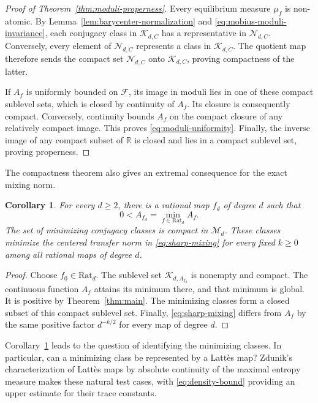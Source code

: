 \documentclass[10pt,a4paper]{amsart}
\newtheorem{corollary}[theorem]{Corollary}
\newcommand{\R}{\mathbb R}
\numberwithin{equation}{section}
\begin{document}
\begin{proof}[Proof of Theorem~\ref{thm:moduli-properness}]
Every equilibrium measure $\mu_f$ is non-atomic. By Lemma~\ref{lem:barycenter-normalization} and \eqref{eq:mobius-moduli-invariance}, each conjugacy class in $\mathcal K_{d,C}$ has a representative in $\mathcal N_{d,C}$. Conversely, every element of $\mathcal N_{d,C}$ represents a class in $\mathcal K_{d,C}$. The quotient map therefore sends the compact set $\mathcal N_{d,C}$ onto $\mathcal K_{d,C}$, proving compactness of the latter.

If $A_f$ is uniformly bounded on $\mathcal F$, its image in moduli lies in one of these compact sublevel sets, which is closed by continuity of $A_f$. Its closure is consequently compact. Conversely, continuity bounds $A_f$ on the compact closure of any relatively compact image. This proves \eqref{eq:moduli-uniformity}. Finally, the inverse image of any compact subset of $\R$ is closed and lies in a compact sublevel set, proving properness.
\end{proof}

The compactness theorem also gives an extremal consequence for the exact mixing norm.

\begin{corollary}\label{cor:moduli-minimum}
For every $d\ge2$, there is a rational map $f_d$ of degree $d$ such that
\[
 0<A_{f_d}=\min_{f\in\mathrm{Rat}_d}A_f.
\]
The set of minimizing conjugacy classes is compact in $\mathcal M_d$. These classes minimize the centered transfer norm in \eqref{eq:sharp-mixing} for every fixed $k\ge0$ among all rational maps of degree $d$.
\end{corollary}

\begin{proof}
Choose $f_0\in\mathrm{Rat}_d$. The sublevel set $\mathcal K_{d,A_{f_0}}$ is nonempty and compact. The continuous function $A_f$ attains its minimum there, and that minimum is global. It is positive by Theorem~\ref{thm:main}. The minimizing classes form a closed subset of this compact sublevel set. Finally, \eqref{eq:sharp-mixing} differs from $A_f$ by the same positive factor $d^{-k/2}$ for every map of degree $d$.
\end{proof}


Corollary~\ref{cor:moduli-minimum} leads to the question of identifying the minimizing classes. In particular, can a minimizing class be represented by a Latt\`es map? Zdunik's characterization of Latt\`es maps by absolute continuity of the maximal entropy measure \cite{Zdu90} makes these natural test cases, with \eqref{eq:density-bound} providing an upper estimate for their trace constants.
\end{document}
